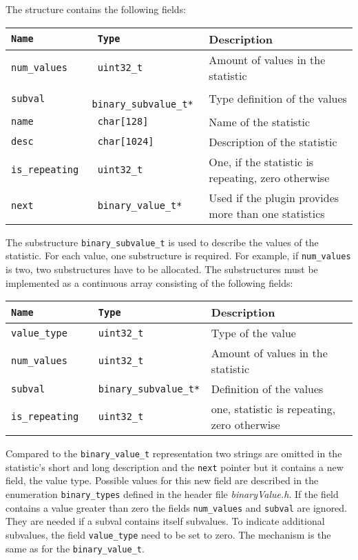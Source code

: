 \documentclass[documentation]{subfiles}
\begin{document}
The structure contains the following fields:
\begin{longtable}{>{\tt}l>{\tt}ll}
    \toprule
    {\bf Name}    & {\bf Type}           & {\bf Description} \\
    \midrule\endhead%
    num\_values   & uint32\_t            & Amount of values in the statistic\\
    subval        & binary\_subvalue\_t* & Type definition of the values\\
    name          & char[128]            & Name of the statistic\\
    desc          & char[1024]           & Description of the statistic\\
    is\_repeating & uint32\_t            & One, if the statistic is repeating, zero otherwise\\
    next          & binary\_value\_t*    & Used if the plugin provides more than one statistics\\
    \bottomrule
\end{longtable}

The substructure {\tt binary\_subvalue\_t} is used to describe the values of the statistic. For each value, one substructure is required. For example, if {\tt num\_values} is two, two substructures have to be allocated. The substructures must be implemented as a continuous array consisting of the following fields:

\begin{longtable}{>{\tt}l>{\tt}ll}
    \toprule
    {\bf Name}    & {\bf Type}           & {\bf Description}\\
    \midrule\endhead%
    value\_type   & uint32\_t            & Type of the value\\
    num\_values   & uint32\_t            & Amount of values in the statistic\\
    subval        & binary\_subvalue\_t* & Definition of the values\\
    is\_repeating & uint32\_t            & one, statistic is repeating, zero otherwise\\
    \bottomrule
\end{longtable}

Compared to the {\tt binary\_value\_t} representation two strings are omitted in the statistic's short and long description and the {\tt *next} pointer but it contains a new field, the value type. Possible values for this new field are described in the enumeration {\tt binary\_types} defined in the header file {\em binaryValue.h}. If the field contains a value greater than zero the fields {\tt num\_values} and {\tt subval} are ignored. They are needed if a subval contains itself subvalues. To indicate additional subvalues, the field {\tt value\_type} need to be set to zero. The mechanism is the same as for the {\tt binary\_value\_t}.\\[2ex]
\end{document}
